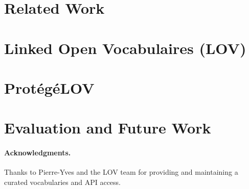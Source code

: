 \documentclass[runningheads,a4paper]{llncs}
\begin{document}
\section{Related Work}\label{sec:soa}




\section{Linked Open Vocabulaires (LOV)}\label{sec:lov}





\section{Prot{\'e}g{\'e}LOV}\label{sec:classification}




\section{Evaluation and Future Work}\label{sec:conclusion}





\paragraph{\textbf{Acknowledgments.}} %
Thanks to Pierre-Yves and the LOV team for providing and maintaining a curated vocabularies and API access.


\nocite{*}

\end{document}
